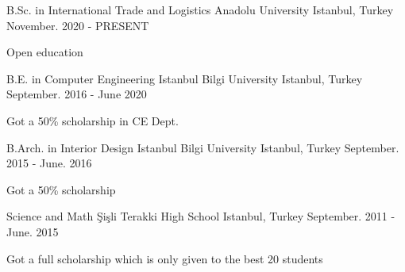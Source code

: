


\begin{cventries}



\cventry
{B.Sc. in International Trade and Logistics} %
{Anadolu University} %
{Istanbul, Turkey} %
{November. 2020 - PRESENT} %
{ %
\begin{cvitems}
\item {Open education}
\end{cvitems}
}


\cventry
{B.E. in Computer Engineering} %
{Istanbul Bilgi University} %
{Istanbul, Turkey} %
{September. 2016 - June 2020} %
{ %
\begin{cvitems}
\item {Got a 50\% scholarship in CE Dept.}
\end{cvitems}
}

\cventry
{B.Arch. in Interior Design} %
{Istanbul Bilgi University} %
{Istanbul, Turkey} %
{September. 2015 - June. 2016} %
{ %
\begin{cvitems}
\item {Got a 50\% scholarship}
\end{cvitems}
}

\cventry
{Science and Math} %
{Şişli Terakki High School } %
{Istanbul, Turkey} %
{September. 2011 - June. 2015} %
{ %
\begin{cvitems}
\item {Got a full scholarship which is only given to the best 20 students}
\end{cvitems}
}



\end{cventries}